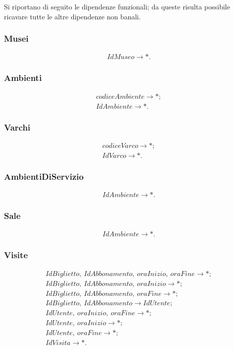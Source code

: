 \documentclass[10pt, italian, openany, landscape, fleqn]{book}
\begin{document}
Si riportano di seguito le dipendenze funzionali; da queste risulta possibile ricavare tutte le altre dipendenze non banali.

\subsubsection*{Musei}
\begin{gather*}
IdMuseo \rightarrow *.
\end{gather*}
\subsubsection*{Ambienti}
\begin{gather*}
codiceAmbiente \rightarrow *; \\
IdAmbiente \rightarrow *.
\end{gather*}
\subsubsection*{Varchi}
\begin{gather*}
codiceVarco \rightarrow *; \\
IdVarco \rightarrow *.
\end{gather*}
\subsubsection*{AmbientiDiServizio}
\begin{gather*}
IdAmbiente \rightarrow *.
\end{gather*}
\subsubsection*{Sale}
\begin{gather*}
IdAmbiente \rightarrow *.
\end{gather*}
\subsubsection*{Visite}
\begin{gather*}
IdBiglietto, \ IdAbbonamento, \ oraInizio, \ oraFine \rightarrow *; \\
IdBiglietto, \ IdAbbonamento, \ oraInizio \rightarrow *; \\
IdBiglietto, \ IdAbbonamento, \ oraFine \rightarrow *; \\
IdBiglietto, \ IdAbbonamento \rightarrow IdUtente; \\
IdUtente, \ oraInizio, \ oraFine \rightarrow *; \\
IdUtente, \ oraInizio \rightarrow *; \\
IdUtente, \ oraFine \rightarrow *; \\
IdVisita \rightarrow *.
\end{gather*}
\end{document}
